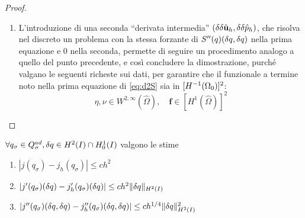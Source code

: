 \begin{proof}
\begin{enumerate}
	\item L'introduzione di una seconda ``derivata intermedia'' $(\delta\delta\hat{\mathbf{u}}_h,\delta\delta\hat{p}_h)$, che risolva nel discreto un problema con la stessa forzante di $S''(q)({\delta q},{\delta q})$ nella prima equazione e 0 nella seconda, permette di seguire un procedimento analogo a quello del punto precedente, e così concludere la dimostrazione, purché valgano le seguenti richeste sui dati, per garantire che il funzionale a termine noto nella prima equazione di \eqref{eq:d2S} sia in $[H^{-1}({\Omega_0})]^2$:
	$$ \eta,\nu\in W^{2,\infty}(\hat{\Omega}),\quad \mathbf f \in [H^1(\hat{\Omega})]^2 $$\qedhere
	\end{enumerate}
\end{proof}
%

\begin{lemma}
	$\forall q_\sigma\in Q^{ad}_\sigma,{\delta q}\in H^2(I)\cap H^1_0(I)$ valgono le stime
	\begin{enumerate}
	\item $|j(q_\sigma)-j_h(q_\sigma)|\leq ch^2$
	\item $|j'({q_\sigma})({\delta q})-j_h'({q_\sigma})({\delta q})|\leq ch^2\|{\delta q}\|_{H^2(I)}$
	\item $|j''({q_\sigma})({\delta q},{\delta q})-j_h''({q_\sigma})({\delta q},{\delta q})|\leq ch^{1/4}\|{\delta q}\|_{H^2(I)}^2$
	\end{enumerate}
\label{th:j-jh}
\end{lemma}
